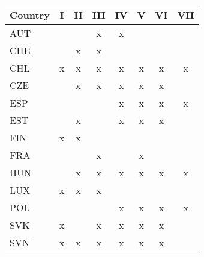 \begin{tabular}{lccccccc}
Country & I & II & III & IV & V & VI & VII \\  \hline 
AUT&&&x&x&&&\\
CHE&&x&x&&&&\\
CHL&x&x&x&x&x&x&x\\
CZE&&x&x&x&x&x&\\
ESP&&&&x&x&x&x\\
EST&&x&&x&x&x&\\
FIN&x&x&&&&&\\
FRA&&&x&&x&&\\
HUN&&x&x&x&x&x&x\\
LUX&x&x&x&&&&\\
POL&&&&x&x&x&x\\
SVK&x&&x&x&x&x&\\
SVN&x&x&x&x&x&x&\\
\hline \end{tabular}
